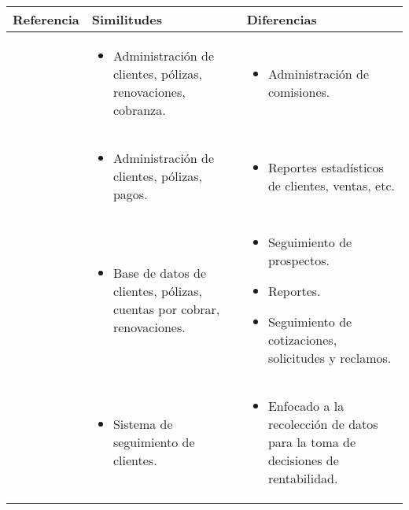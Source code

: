 \begin{table}[h!] %
  \begin{tabular}{p{} p{} p{}}
    \toprule
    \textbf{{Referencia}} & \textbf{{Similitudes}} & \textbf{{Diferencias}} \\
    \toprule
    \cite{www:sicas} &
    \begin{itemize}[leftmargin=*]
        \item Administración de clientes, pólizas, renovaciones, cobranza.
    \end{itemize} &
    \begin{itemize}[leftmargin=*]
        \item Administración de comisiones.
    \end{itemize} \\
    \midrule
    
    \cite{www:insly} &
    \begin{itemize}[leftmargin=*]
        \item Administración de clientes, pólizas, pagos.
    \end{itemize} &
    \begin{itemize}[leftmargin=*]
        \item Reportes estadísticos de clientes, ventas, etc.
    \end{itemize} \\

\midrule
\cite{www:asesorestic} &
\begin{itemize}[leftmargin=*]
	\item Base de datos de clientes, pólizas, cuentas por cobrar, renovaciones.
\end{itemize} &
\begin{itemize}[leftmargin=*]
	\item Seguimiento de prospectos.
	\item Reportes.
	\item Seguimiento de cotizaciones, solicitudes y reclamos.
\end{itemize} \\

\midrule
\cite{pro:crm} &
\begin{itemize}[leftmargin=*]
	\item Sistema de seguimiento de clientes.
\end{itemize} &
\begin{itemize}[leftmargin=*]
	\item Enfocado a la recolección de datos para la toma de decisiones de rentabilidad.
\end{itemize} \\


\end{tabular}
\end{table}
